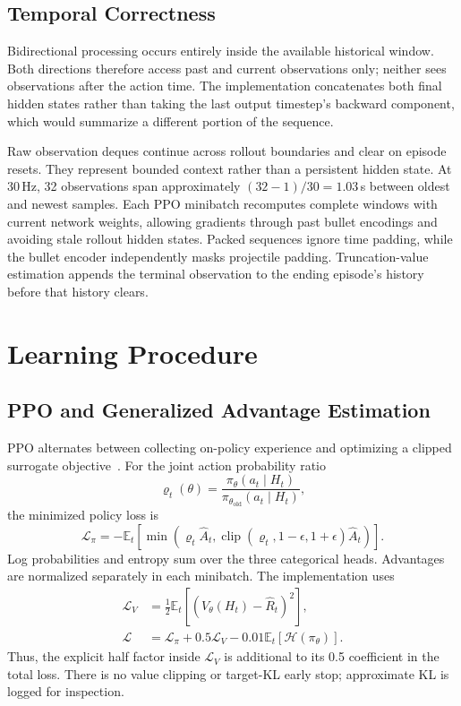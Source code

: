 \documentclass[conference]{IEEEtran}
\newcommand{\E}{\mathbb{E}}
\begin{document}
\subsection{Temporal Correctness}
Bidirectional processing occurs entirely inside the available historical window. Both directions therefore access past and current observations only; neither sees observations after the action time. The implementation concatenates both final hidden states rather than taking the last output timestep's backward component, which would summarize a different portion of the sequence.

Raw observation deques continue across rollout boundaries and clear on episode resets. They represent bounded context rather than a persistent hidden state. At 30\,Hz, 32 observations span approximately $(32-1)/30=1.03$\,s between oldest and newest samples. Each PPO minibatch recomputes complete windows with current network weights, allowing gradients through past bullet encodings and avoiding stale rollout hidden states. Packed sequences ignore time padding, while the bullet encoder independently masks projectile padding. Truncation-value estimation appends the terminal observation to the ending episode's history before that history clears.

\section{Learning Procedure}
\subsection{PPO and Generalized Advantage Estimation}
PPO alternates between collecting on-policy experience and optimizing a clipped surrogate objective~\cite{ppo}. For the joint action probability ratio
\begin{equation}
\varrho_t(\theta)=\frac{\pi_\theta(a_t\mid H_t)}{\pi_{\theta_{\mathrm{old}}}(a_t\mid H_t)},
\end{equation}
the minimized policy loss is
\begin{equation}
\mathcal{L}_{\pi}=-\E_t\!\left[\min\!\left(\varrho_t\widehat{A}_t,
\operatorname{clip}(\varrho_t,1-\epsilon,1+\epsilon)\widehat{A}_t\right)\right].
\end{equation}
Log probabilities and entropy sum over the three categorical heads. Advantages are normalized separately in each minibatch. The implementation uses
\begin{align}
\mathcal{L}_V &= \tfrac12\E_t[(V_\theta(H_t)-\widehat{R}_t)^2],\\
\mathcal{L} &= \mathcal{L}_{\pi}+0.5\mathcal{L}_V-0.01\E_t[\mathcal{H}(\pi_\theta)].
\end{align}
Thus, the explicit half factor inside $\mathcal{L}_V$ is additional to its 0.5 coefficient in the total loss. There is no value clipping or target-KL early stop; approximate KL is logged for inspection.
\end{document}
